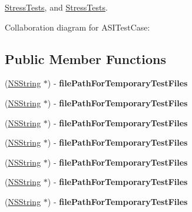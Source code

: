 \hyperlink{interface_stress_tests}{\-Stress\-Tests}, and \hyperlink{interface_stress_tests}{\-Stress\-Tests}.



\-Collaboration diagram for \-A\-S\-I\-Test\-Case\-:
\subsection*{\-Public \-Member \-Functions}
\begin{DoxyCompactItemize}
\item 
\hypertarget{interface_a_s_i_test_case_a8f811b228fdea5a5f66932fa6bc4fbea}{
(\hyperlink{class_n_s_string}{\-N\-S\-String} $\ast$) -\/ {\bfseries file\-Path\-For\-Temporary\-Test\-Files}}
\label{interface_a_s_i_test_case_a8f811b228fdea5a5f66932fa6bc4fbea}

\item 
\hypertarget{interface_a_s_i_test_case_a8f811b228fdea5a5f66932fa6bc4fbea}{
(\hyperlink{class_n_s_string}{\-N\-S\-String} $\ast$) -\/ {\bfseries file\-Path\-For\-Temporary\-Test\-Files}}
\label{interface_a_s_i_test_case_a8f811b228fdea5a5f66932fa6bc4fbea}

\item 
\hypertarget{interface_a_s_i_test_case_a8f811b228fdea5a5f66932fa6bc4fbea}{
(\hyperlink{class_n_s_string}{\-N\-S\-String} $\ast$) -\/ {\bfseries file\-Path\-For\-Temporary\-Test\-Files}}
\label{interface_a_s_i_test_case_a8f811b228fdea5a5f66932fa6bc4fbea}

\item 
\hypertarget{interface_a_s_i_test_case_a8f811b228fdea5a5f66932fa6bc4fbea}{
(\hyperlink{class_n_s_string}{\-N\-S\-String} $\ast$) -\/ {\bfseries file\-Path\-For\-Temporary\-Test\-Files}}
\label{interface_a_s_i_test_case_a8f811b228fdea5a5f66932fa6bc4fbea}

\item 
\hypertarget{interface_a_s_i_test_case_a8f811b228fdea5a5f66932fa6bc4fbea}{
(\hyperlink{class_n_s_string}{\-N\-S\-String} $\ast$) -\/ {\bfseries file\-Path\-For\-Temporary\-Test\-Files}}
\label{interface_a_s_i_test_case_a8f811b228fdea5a5f66932fa6bc4fbea}

\item 
\hypertarget{interface_a_s_i_test_case_a8f811b228fdea5a5f66932fa6bc4fbea}{
(\hyperlink{class_n_s_string}{\-N\-S\-String} $\ast$) -\/ {\bfseries file\-Path\-For\-Temporary\-Test\-Files}}
\label{interface_a_s_i_test_case_a8f811b228fdea5a5f66932fa6bc4fbea}

\item 
\hypertarget{interface_a_s_i_test_case_a8f811b228fdea5a5f66932fa6bc4fbea}{
(\hyperlink{class_n_s_string}{\-N\-S\-String} $\ast$) -\/ {\bfseries file\-Path\-For\-Temporary\-Test\-Files}}
\label{interface_a_s_i_test_case_a8f811b228fdea5a5f66932fa6bc4fbea}


\end{DoxyCompactItemize}

